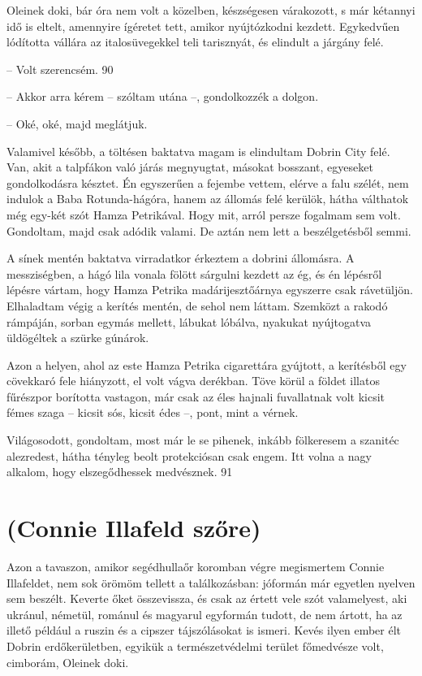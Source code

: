 \documentclass{IEEEtran}
\begin{document}
Oleinek doki, bár óra nem volt a közelben, készségesen várakozott, s már
kétannyi idő is eltelt, amennyire ígéretet tett, amikor nyújtózkodni kezdett.
Egykedvűen lódította vállára az italosüvegekkel teli tarisznyát, és elindult a
járgány felé.

– Volt szerencsém.
90

– Akkor arra kérem – szóltam utána –, gondolkozzék a dolgon.

– Oké, oké, majd meglátjuk.

Valamivel később, a töltésen baktatva magam is elindultam Dobrin City felé.
Van, akit a talpfákon való járás megnyugtat, másokat bosszant, egyeseket
gondolkodásra késztet. Én egyszerűen a fejembe vettem, elérve a falu szélét,
nem indulok a Baba Rotunda-hágóra, hanem az állomás felé kerülök, hátha
válthatok még egy-két szót Hamza Petrikával. Hogy mit, arról persze fogalmam
sem volt. Gondoltam, majd csak adódik valami. De aztán nem lett a
beszélgetésből semmi.

A sínek mentén baktatva virradatkor érkeztem a dobrini állomásra. A
messziségben, a hágó lila vonala fölött sárgulni kezdett az ég, és én lépésről
lépésre vártam, hogy Hamza Petrika madárijesztőárnya egyszerre csak
rávetüljön. Elhaladtam végig a kerítés mentén, de sehol nem láttam. Szemközt a
rakodó rámpáján, sorban egymás mellett, lábukat lóbálva, nyakukat nyújtogatva
üldögéltek a szürke gúnárok.

Azon a helyen, ahol az este Hamza Petrika cigarettára gyújtott, a kerítésből
egy cövekkaró fele hiányzott, el volt vágva derékban. Töve körül a földet
illatos fűrészpor borította vastagon, már csak az éles hajnali fuvallatnak
volt kicsit fémes szaga – kicsit sós, kicsit édes –, pont, mint a vérnek.

Világosodott, gondoltam, most már le se pihenek, inkább fölkeresem a szanitéc
alezredest, hátha tényleg beolt protekciósan csak engem. Itt volna a nagy
alkalom, hogy elszegődhessek medvésznek.
91
\section{(Connie Illafeld szőre)}

Azon a tavaszon, amikor segédhullaőr koromban végre megismertem Connie
Illafeldet, nem sok örömöm tellett a találkozásban: jóformán már egyetlen
nyelven sem beszélt. Keverte őket összevissza, és csak az értett vele szót
valamelyest, aki ukránul, németül, románul és magyarul egyformán tudott, de
nem ártott, ha az illető például a ruszin és a cipszer tájszólásokat is
ismeri. Kevés ilyen ember élt Dobrin erdőkerületben, egyikük a
természetvédelmi terület főmedvésze volt, cimborám, Oleinek doki.
\end{document}
